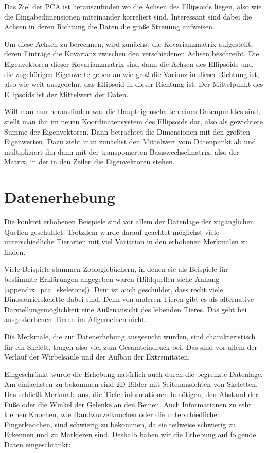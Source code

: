  Das Ziel der PCA ist herauszufinden wo die Achsen des Ellipsoids liegen, also wie die Eingabedimensionen miteinander korreliert sind. Interessant sind dabei die Achsen in deren Richtung die Daten die größe Streuung aufweisen.
 
 Um diese Achsen zu berechnen, wird zunächst die Kovarianzmatrix aufgestellt, deren Einträge die Kovarianz zwischen den verschiedenen Achsen beschreibt.
 Die Eigenvektoren dieser Kovarianzmatrix sind dann die Achsen des Ellipsoids und die zugehörigen Eigenwerte geben an wie groß die Varianz in dieser Richtung ist, also wie weit ausgedehnt das Ellipsoid in dieser Richtung ist. Der Mittelpunkt des Ellipsoids ist der Mittelwert der Daten.
 
 Will man nun herausfinden was die Haupteigenschaften eines Datenpunktes sind, stellt man ihn im neuen Koordinatensystem des Ellipsoids dar, also als gewichtete Summe der Eigenvektoren. Dann betrachtet die Dimensionen mit den größten Eigenwerten. Dazu zieht man zunächst den Mittelwert vom Datenpunkt ab und multipliziert ihn dann mit der transponierten Basiswechselmatrix, also der Matrix, in der in den Zeilen die Eigenvektoren stehen.


 \section{Datenerhebung}
 
 Die konkret erhobenen Beispiele sind vor allem der Datenlage \bzw der zugänglichen Quellen geschuldet. Trotzdem wurde darauf geachtet möglichst viele unterschiedliche Tierarten mit viel Variation in den erhobenen Merkmalen zu finden.
 
 Viele Beispiele stammen Zoologiebüchern, in denen sie als Beispiele für bestimmte Erklärungen angegeben waren (Bildquellen siehe Anhang \ref{appendix_pca_skeletons}). Dem ist auch geschuldet, dass recht viele Dinosaurierskelette dabei sind. Denn von anderen Tieren gibt es als alternative Darstellungsmöglichkeit eine Außenansicht des lebenden Tieres. Das geht bei ausgestorbenen Tieren im Allgemeinen nicht.
 
 Die Merkmale, die zur Datenerhebung ausgesucht wurden, sind charakteristisch für ein Skelett, tragen also viel zum Gesamteindruck bei. Das sind vor allem der Verlauf der Wirbelsäule und der Aufbau der Extremitäten.
  
 Eingeschränkt wurde die Erhebung natürlich auch durch die begrenzte Datenlage. Am einfachsten zu bekommen sind 2D-Bilder mit Seitenansichten von Skeletten. Das schließt Merkmale aus, die Tiefeninformationen benötigen, \zb den Abstand der Füße oder die Winkel der Gelenke an den Beinen. Auch Informationen zu sehr kleinen Knochen, wie Handwurzelknochen oder die unterschiedlichen Fingerknochen, sind schwierig zu bekommen, da sie teilweise schwierig zu Erkennen und zu Markieren sind. Deshalb haben wir die Erhebung auf folgende Daten eingeschränkt:
  
